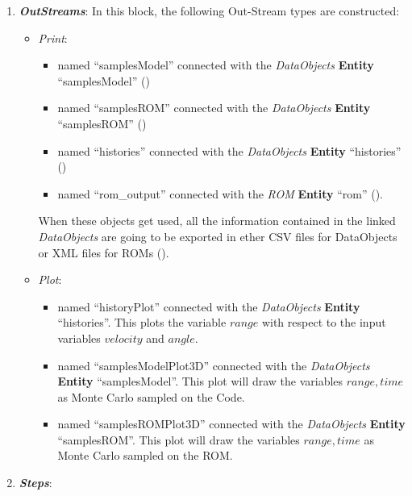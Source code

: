 \begin{enumerate}
\begin{figure}[h!]
 \end{figure}
   \item \textbf{\textit{OutStreams}}:
  In this block, the following Out-Stream types are constructed:
  \begin{itemize}
    \item \textit{Print}:
     \begin{itemize}
       \item named ``samplesModel'' connected with the \textit{DataObjects} \textbf{Entity} ``samplesModel''
                ()
       \item named ``samplesROM'' connected with the \textit{DataObjects} \textbf{Entity} ``samplesROM''
                ()
       \item named ``histories'' connected with the \textit{DataObjects} \textbf{Entity} ``histories'' ()
       \item named ``rom\_output'' connected with the \textit{ROM} \textbf{Entity} ``rom'' ().
     \end{itemize}
      When these objects get used, all the information contained in the
      linked  \textit{DataObjects} are going
    to be exported in ether CSV files for DataObjects or XML files for ROMs ().
    \item \textit{Plot}:
    \begin{itemize}
      \item named ``historyPlot'' connected with the  \textit{DataObjects}
      \textbf{Entity} ``histories''.  This plots the
      variable $range$ with respect to the input variables $velocity$ and $angle$.
      \item named ``samplesModelPlot3D'' connected with the
      \textit{DataObjects} \textbf{Entity} ``samplesModel''. This plot will draw the
      variables $range,time$ as Monte Carlo sampled on the Code.
      \item named ``samplesROMPlot3D'' connected with the
      \textit{DataObjects} \textbf{Entity} ``samplesROM''. This plot will draw the
      variables $range,time$ as Monte Carlo sampled on the ROM.
    \end{itemize}
  \end{itemize}
   \item \textbf{\textit{Steps}}:

\end{enumerate}
